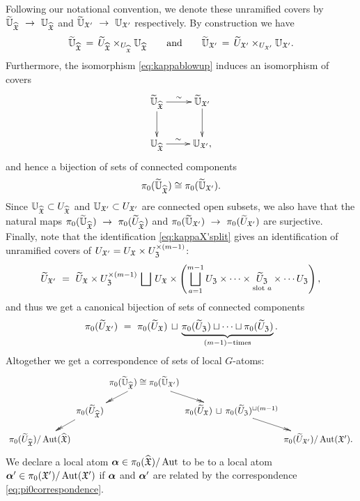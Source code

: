 \documentclass[twoside,leqno]{article}
\numberwithin{equation}{section}
\theoremstyle{plain}
\theoremstyle{definition}
\begin{document}
Following our notational convention, we denote these unramified covers by 
$\widetilde{\maxeigbup}_{\widehat{\fX}} \ \to \ \maxeigbup_{\widehat{\fX}}$ and 
$\widetilde{\maxeigbup}_{\fX'} \ \to \ \maxeigbup_{\fX'}$ respectively. By construction we have
\[
\widetilde{\mathbb{U}}_{\widehat{\mathfrak X}} \, = \, \widetilde{U}_{\widehat{\mathfrak X}} \times_{U_{\widehat{\mathfrak X}}} \mathbb{U}_{\widehat{\mathfrak X}} \qquad \text{and} \qquad 
\widetilde{\mathbb{U}}_{\mathfrak X'} \, = \, \widetilde{U}_{\mathfrak X'} \times_{U_{\mathfrak X'}} 
\mathbb{U}_{\mathfrak X'}.
\]
Furthermore, the isomorphism \eqref{eq:kappablowup} induces an isomorphism of covers
\[
\xymatrix{\widetilde{\maxeigbup}_{\widehat{\fX}} \ar[d] \ar[r]^-{\sim} & 
\widetilde{\maxeigbup}_{\fX'}  \ar[d] \\
\maxeigbup_{\widehat{\fX}} \ar[r]^-{\sim} & \maxeigbup_{\fX'},
}
\]
and hence a bijection  of sets of connected components
\[
\pi_{0}(\widetilde{\mathbb{U}}_{\widehat{\mathfrak X}}) \cong  \pi_{0}(\widetilde{\mathbb{U}}_{\mathfrak X'}).
\]
Since $\mathbb{U}_{\widehat{\mathfrak X}} \subset U_{\widehat{\mathfrak X}}$ and 
$\mathbb{U}_{\mathfrak X'} \subset U_{\mathfrak X'}$ are connected open subsets, we also have that the natural maps $\pi_{0}(\widetilde{\maxeigbup}_{\widehat{\fX}}) \ \to \ 
\pi_{0}(\widetilde{U}_{\widehat{\fX}})$ and 
$\pi_{0}(\widetilde{\maxeigbup}_{\fX'}) \ \to \ 
\pi_{0}(\widetilde{U}_{\fX'})$ are surjective. 
Finally, note that the identification \eqref{eq:kappaX'split} gives an identification of unramified covers of $U_{\mathfrak X'} = U_{\mathfrak X}\times U_{\mathfrak Z}^{\times (m-1)}$:
\[
\widetilde{U}_{\fX'} \ = \ \widetilde{U}_{\fX}\times U_{\fZ}^{\times (m-1)} \, \bigsqcup \, 
U_{\fX} \times \left(\bigsqcup_{a = 1}^{m-1} U_{\fZ}\times \cdots \times \underset{\text{slot } a}{\widetilde{U}_{\fZ}} \times \cdots U_{\fZ}\right),
\]
and thus we get a canonical bijection of sets of connected components
\[
\pi_{0}(\widetilde{U}_{\fX'}) \ = \ \pi_{0}(\widetilde{U}_{\fX})\, \sqcup \, \underbrace{\pi_{0}(\widetilde{U}_{\fZ}) \sqcup \cdots \sqcup \pi_{0}(\widetilde{U}_{\fZ})}_{(m-1)-\text{times}}.
\]
Altogether we get a correspondence of sets of local $G$-atoms:
\begin{equation} \label{eq:pi0correspondence}
\xymatrix@C-2pc@R-1pc{
& & \pi_{0}(\widetilde{\maxeigbup}_{\widehat{\fX}}) \cong  \pi_{0}(\widetilde{\maxeigbup}_{\fX'}) \ar@{->>}[dl] \ar@{->>}[dr] & & \\
& \pi_{0}(\widetilde{U}_{\widehat{\fX}}) \ar@{->>}[dl] & & \pi_{0}(\widetilde{U}_{\fX})\, \sqcup \, \pi_{0}(\widetilde{U}_{\fZ})^{\sqcup (m-1)} \ar@{->>}[dr] & \\
\pi_{0}(\widetilde{U}_{\widehat{\fX}})/\op{Aut}(\widehat{\fX}) & & & & 
\pi_{0}(\widetilde{U}_{\fX'})/\op{Aut}(\fX').
}
\end{equation}
We declare a local atom $\boldsymbol{\alpha} \in \pi_{0}(\widehat{\mathfrak X})/\operatorname{Aut}$ to be  to a local atom $\boldsymbol{\alpha}' \in \pi_{0}(\mathfrak X')/\operatorname{Aut}(\mathfrak X')$ if $\boldsymbol{\alpha}$ and $\boldsymbol{\alpha}'$ are related by the correspondence 
\eqref{eq:pi0correspondence}.
\end{document}
